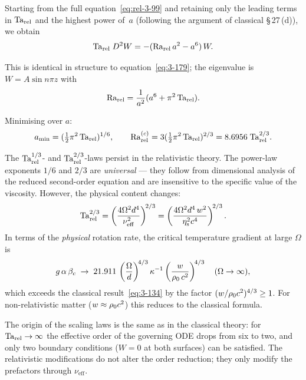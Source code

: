 Starting from the full equation~\eqref{eq:rel-3-99} and retaining only
the leading terms in $\mathrm{Ta}_{\mathrm{rel}}$ and the highest power of~$a$
(following the argument of classical \S\,27\,(d)), we obtain
\begin{equation}\label{eq:rel-3-179}
  \mathrm{Ta}_{\mathrm{rel}}\;D^2 W = -(\mathrm{Ra}_{\mathrm{rel}}\,a^2 - a^6)\,W.
\end{equation}

This is identical in structure to equation~\eqref{eq:3-179}; the
eigenvalue is $W = A\sin n\pi z$ with
\begin{equation}\label{eq:rel-3-181}
  \mathrm{Ra}_{\mathrm{rel}} = \frac{1}{a^2}(a^6 + \pi^2\,\mathrm{Ta}_{\mathrm{rel}}).
\end{equation}

Minimising over $a$:
\begin{equation}\label{eq:rel-3-183}
  a_{\min} = (\tfrac{1}{2}\pi^2\,\mathrm{Ta}_{\mathrm{rel}})^{1/6},
  \qquad
  \mathrm{Ra}_{\mathrm{rel}}^{(c)} = 3(\tfrac{1}{2}\pi^2\,\mathrm{Ta}_{\mathrm{rel}})^{2/3}
               = 8.6956\;\mathrm{Ta}_{\mathrm{rel}}^{2/3}.
\end{equation}

\begin{relcorrection}
The $\mathrm{Ta}_{\mathrm{rel}}^{1/3}$- and $\mathrm{Ta}_{\mathrm{rel}}^{2/3}$-laws persist in the
relativistic theory.  The power-law exponents $1/6$ and $2/3$ are
\emph{universal} --- they follow from dimensional analysis of the
reduced second-order equation and are insensitive to the specific value
of the viscosity.  However, the physical content changes:
\[
  \mathrm{Ta}_{\mathrm{rel}}^{2/3}
  = \left(\frac{4\Omega^2 d^4}{\nu_{\mathrm{eff}}^2}\right)^{\!2/3}
  = \left(\frac{4\Omega^2 d^4\,w^2}
              {\eta_{\mathrm{s}}^2 c^4}\right)^{\!2/3}.
\]
In terms of the \emph{physical} rotation rate, the critical temperature
gradient at large $\Omega$ is
\begin{equation}\label{eq:rel-3-134}
  g\,\alpha\,\beta_c
  \;\to\; 21.911\,\left(\frac{\Omega}{d}\right)^{\!4/3}
          \kappa^{-1}
          \left(\frac{w}{\rho_0\,c^2}\right)^{\!4/3}
  \quad (\Omega \to \infty),
\end{equation}
which exceeds the classical result~\eqref{eq:3-134} by the factor
$(w/\rho_0 c^2)^{4/3} \geq 1$.  For non-relativistic matter
($w \approx \rho_0 c^2$) this reduces to the classical
formula.
\end{relcorrection}

The origin of the scaling laws is the same as in the classical theory:
for $\mathrm{Ta}_{\mathrm{rel}} \to \infty$ the effective order of the governing ODE drops
from six to two, and only two boundary conditions ($W = 0$ at both
surfaces) can be satisfied.  The relativistic modifications do not alter
the order reduction; they only modify the prefactors through
$\nu_{\mathrm{eff}}$.


